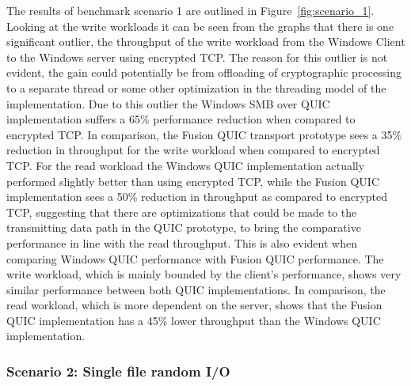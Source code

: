 \documentclass[english, 12pt, a4paper, elec, utf8, a-2b, online]{aaltothesis}
\begin{document}
The results of benchmark scenario 1 are outlined in Figure~\ref{fig:scenario_1}.
Looking at the write workloads it can be seen from the graphs that there is
one significant outlier, the throughput of the write workload from the Windows Client
to the Windows server using encrypted TCP.
The reason for this outlier is not evident, the gain could potentially be from offloading
of cryptographic processing to a separate thread or some other optimization in the
threading model of the implementation. 
Due to this outlier the Windows SMB over QUIC implementation suffers a 65\%
performance reduction when compared to encrypted TCP. In comparison, the Fusion QUIC
transport prototype sees a 35\% reduction in throughput for the write workload when compared
to encrypted TCP. For the read
workload the Windows QUIC implementation actually performed slightly better than
using encrypted TCP, while the Fusion QUIC implementation sees a 50\% reduction in
throughput as compared to encrypted TCP, suggesting that there are optimizations
that could be made to the transmitting data path in the QUIC prototype, to bring
the comparative performance in line with the read throughput. This is also evident
when comparing Windows QUIC performance with Fusion QUIC performance. The write
workload, which is mainly bounded by the client's performance, shows very similar performance between
both QUIC implementations. In comparison, the read workload, which is more dependent
on the server, shows that the Fusion QUIC implementation has a 45\% lower throughput than
the Windows QUIC implementation.

\subsubsection{Scenario 2: Single file random I/O}
\end{document}
